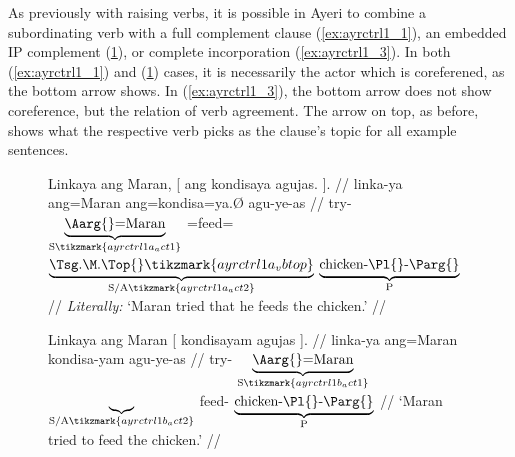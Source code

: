 As previously with raising verbs, it is possible in Ayeri to combine a
subordinating verb with a full complement clause (\ref{ex:ayrctrl1_1}), an
embedded IP complement (\ref{ex:ayrctrl1_2}), or complete incorporation
(\ref{ex:ayrctrl1_3}). In both (\ref{ex:ayrctrl1_1}) and (\ref{ex:ayrctrl1_2})
cases, it is necessarily the actor which is coreferened, as the bottom arrow
shows. In (\ref{ex:ayrctrl1_3}), the bottom arrow does not show coreference,
but the relation of verb agreement. The arrow on top, as before, shows what the
respective verb picks as the clause's topic for all example sentences.

\begin{figure}
\pex\label{ex:ayrctrl1}
\a\label{ex:ayrctrl1_1}\begingl[aboveglcskip=1.5em, aboveglftskip=1.75em]
	\gla Linkaya {ang Maran}, \textup{[} {ang kondisaya} agujas. 
		\textup{]}. //
	\glb linka-ya ang=Maran {} ang=kondisa=ya.Ø agu-ye-as {} //
	\glc try-\TsgM{}
		$\underbrace{\text{\Aarg{}=Maran}}_{\text{S}%
			\tikzmark{ayrctrl1a_act1}
		}$
		{}
		\AgtT{}=feed=$\underbrace{\text{\smash{\TsgM{}}.\Top{}}%
			\tikzmark{ayrctrl1a_vbtop}
		}_{\text{S/A}%
			\tikzmark{ayrctrl1a_act2}
		}$
		$\underbrace{\text{chicken-\Pl{}-\Parg{}}}_{\text{P}}$
		{}
		//
	\glft \textit{Literally:} `Maran tried that he feeds the chicken.' //
\endgl
{}

\a\label{ex:ayrctrl1_2}\begingl[aboveglftskip=1.75em]
	\gla Linkaya {ang Maran} \textup{[} {} kondisayam agujas
		\textup{]}. //
	\glb linka-ya ang=Maran {} {} kondisa-yam agu-ye-as {} //
	\glc try-\TsgM{}
		$\underbrace{\text{\Aarg{}=Maran}}_{\text{S}%
			\tikzmark{ayrctrl1b_act1}
		}$
		{}
		$\underbrace{}_{\text{S/A}\tikzmark{ayrctrl1b_act2}}$
		feed-\Ptcp{}
		$\underbrace{\text{chicken-\Pl{}-\Parg{}}}_{\text{P}}$
		{}
		//
	\glft `Maran tried to feed the chicken.' //
\endgl
{}


\end{figure}
